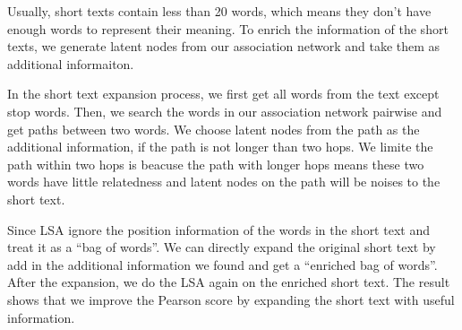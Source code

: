 Usually, short texts contain less than 20 words, which means they don't 
have enough words to represent their meaning. 
To enrich the information of the short texts, we generate latent nodes from 
our association network and take them as additional informaiton.

In the short text expansion process, 
we first get all words from the text except stop words. Then, we search the 
words in our association network pairwise and get paths between two 
words. We choose latent nodes from the path as the additional information, 
if the path is not longer than two hops. We limite the path within 
two hops is beacuse the path with longer hops means these two words have 
little relatedness and latent nodes on the path will be noises to the short text. 

Since LSA ignore the position information of the words in the short text 
and treat it as a ``bag of words''. We can directly expand the original short text 
by add in the additional information we found and get a ``enriched bag of words''. 
After the expansion, we do the LSA again on the enriched short text. 
The result shows that we improve the Pearson score by expanding the short text 
with useful information.





